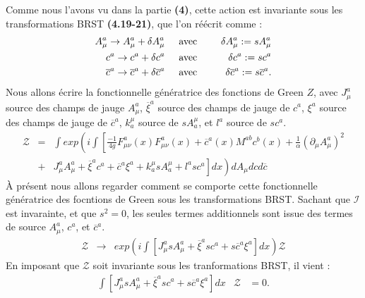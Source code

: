 \documentclass[a4paper,11pt]{article} %
\theoremstyle{plain}
\theoremstyle{definition}
\theoremstyle{remark}
\numberwithin{equation}{section}
\numberwithin{equation}{subsection}
\numberwithin{figure}{section}
\begin{document}
\noindent
Comme nous l'avons vu dans la partie \textbf{(4)}, cette action est invariante sous les transformations BRST \textbf{(4.19-21)}, 
que l'on réécrit comme :
\begin{eqnarray*}
 A_{\mu}^{a} \rightarrow  A_{\mu}^{a} + \delta  A_{\mu}^{a}   \hspace{5mm}  &\text{avec}&   \hspace{5mm}  \delta  A_{\mu}^{a} := s  A_{\mu}^{a} \\
 c^{a}  \rightarrow  c^{a}  + \delta  c^{a}   \hspace{5mm}  &\text{avec}&   \hspace{5mm}    \delta  c^{a} := s  c^{a}  \\
 \overline{c}^{a}  \rightarrow  \overline{c}^{a}  + \delta  \overline{c}^{a}   \hspace{5mm}  &\text{avec}&   \hspace{5mm} 
\delta  \overline{c}^{a} := s  \overline{c}^{a}  .
\end{eqnarray*}
Nous allons écrire la fonctionnelle génératrice des fonctions de Green $Z$, avec $ J_{\mu}^{a}$ source des champs de jauge $A_{\mu}^{a}$, 
$\overline{\xi}^{a}$ source des champs de jauge de $c^{a}$,  $\xi^{a}$ source des champs de jauge de $\overline{c}^{a}$, $k^{\mu}_{a}$ source 
de $sA^{\mu}_{a}$, et $l^{a}$ source de $sc^{a}$.
\begin{eqnarray*}
 \mathcal{Z} &=& \int exp\left( i \int \left[
\frac{-1}{4g} F^{a}_{\mu\nu}(x)F^{a}_{\mu \nu}(x) + \overline{c}^{a}(x)M^{ab}c^{b}(x) 
+ \frac{1}{\alpha}(\partial_{\mu}A_{\mu}^{a})^2 \right. \right. \nonumber \\
     &+& \left. \left. J_{\mu}^{a}A_{\mu}^{a} + \overline{\xi}^{a}c^{a} + \overline{c}^{a}\xi^{a} + k^{\mu}_{a}sA^{\mu}_{a} 
+ l^{a}sc^{a} \right] dx \right) dA_{\mu} dc d\overline{c} 
\end{eqnarray*}
À présent nous allons regarder comment se comporte cette fonctionnelle génératrice des focntions de Green sous les transformations BRST. Sachant que $\mathcal{I}$ est invarainte, et que $s^2=0$, les seules termes additionnels sont issue des termes de source $A_{\mu}^{a}$, $c^{a}$, et $\overline{c}^{a}$.
\begin{eqnarray*}
 \mathcal{Z} &\rightarrow&  exp \left( i \int \left[ J_{\mu}^{a} s A_{\mu}^{a} + \overline{\xi}^{a} s c^{a} + s \overline{c}^{a} \xi^{a} \right] dx \right)  \mathcal{Z}
\end{eqnarray*}
En imposant que $\mathcal{Z}$ soit invariante sous les tranformations BRST, il vient :
\begin{eqnarray*}
\int \left[ J_{\mu}^{a} s A_{\mu}^{a} + \overline{\xi}^{a} s c^{a} + s \overline{c}^{a} \xi^{a} \right] dx  & \mathcal{Z}&  = 0.
\end{eqnarray*}
\end{document}
